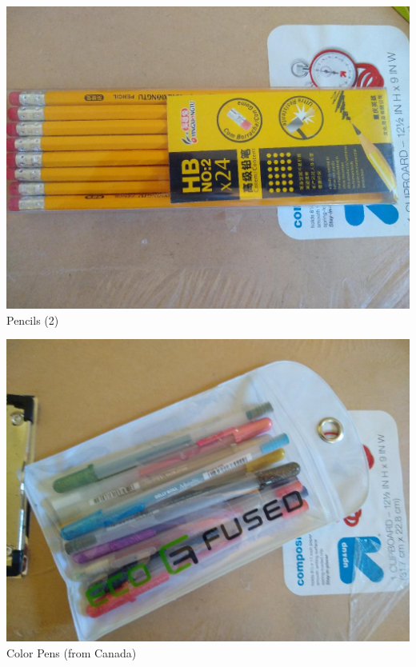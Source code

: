 \documentclass[t]{beamer}
\newcommand{\htarget}[2]{\hypertarget{#1}{#2}}
\begin{document}
\begin{frame}\htarget{pencil2}{} \begin{center}
\includegraphics[height=0.8\textheight]{pencil_mini.jpg} \\
Pencils (2)
\end{center} \end{frame}
\begin{frame}\htarget{colorpens}{} \begin{center}
\includegraphics[height=0.8\textheight]{color_pens_mini.jpg} \\
Color Pens (from Canada)
\end{center} \end{frame}
\end{document}
